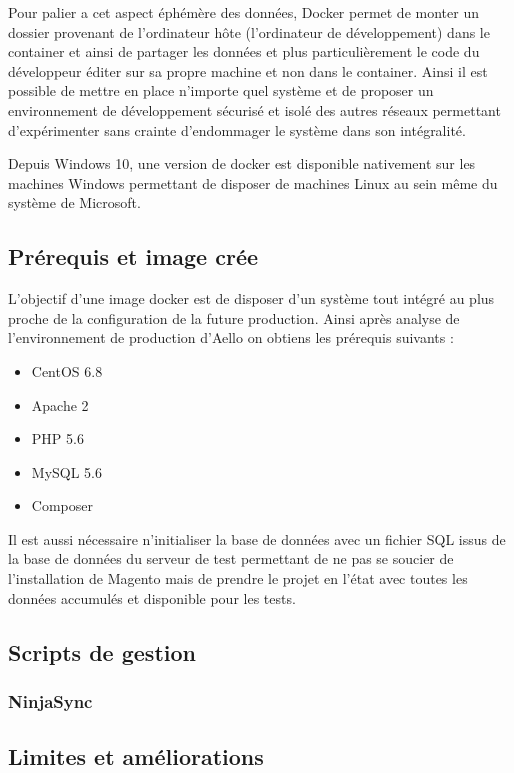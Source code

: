 \documentclass{Article}
\begin{document}
	Pour palier a cet aspect éphémère des données, Docker permet de monter un dossier provenant de l'ordinateur hôte (l'ordinateur de développement) dans le container et ainsi de partager les données et plus particulièrement le code du développeur éditer sur sa propre machine et non dans le container. Ainsi il est possible de mettre en place n'importe quel système et de proposer un environnement de développement sécurisé et isolé des autres réseaux permettant d'expérimenter sans crainte d’endommager le système dans son intégralité.

	Depuis Windows 10, une version de docker est disponible nativement sur les machines Windows permettant de disposer de machines Linux au sein même du système de Microsoft.

	\subsection{Prérequis et image crée}

	L'objectif d'une image docker est de disposer d'un système tout intégré au plus proche de la configuration de la future production. Ainsi après analyse de l'environnement de production d'Aello on obtiens les prérequis suivants :

	\begin{itemize}
		\item CentOS 6.8
		\item Apache 2
		\item PHP 5.6
		\item MySQL 5.6
		\item Composer
	\end{itemize}

	Il est aussi nécessaire n'initialiser la base de données avec un fichier SQL issus de la base de données du serveur de test permettant de ne pas se soucier de l'installation de Magento mais de prendre le projet en l’état avec toutes les données accumulés et disponible pour les tests.
	
	\subsection{Scripts de gestion}
		\subsubsection{NinjaSync}
	\subsection{Limites et améliorations}
\end{document}
